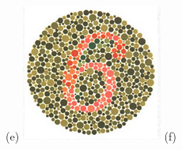 \documentclass[	12pt, Times, openright, twoside, a4paper, english, brazil]{abntex2}
\begin{document}
\begin{apendicesenv}
\begin{figure}[!htb]
(e)
\endminipage\hfill
{}
\centering
{\includegraphics[width=\linewidth]{ishihara-transformacao/figureIshihara3.png}}
(f)
\endminipage\hfill


\end{figure}
\end{apendicesenv}
\end{document}
